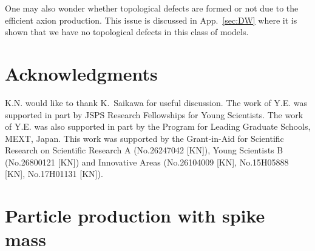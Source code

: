 \documentclass[12pt, a4paper]{article}
\begin{document}
One may also wonder whether topological defects are formed or not due to the efficient axion production.
This issue is discussed in App.~\ref{sec:DW} where it is shown that we have no topological defects in this class of models.




\section*{Acknowledgments}

K.N. would like to thank K.~Saikawa for useful discussion.
The work of Y.E. was supported in part by JSPS Research Fellowships for Young Scientists.
The work of Y.E. was also supported in part by the Program for Leading Graduate Schools, MEXT, Japan.
This work was supported by the Grant-in-Aid for Scientific Research on Scientific Research A (No.26247042 [KN]),
Young Scientists B (No.26800121 [KN]) and Innovative Areas (No.26104009 [KN], No.15H05888 [KN], No.17H01131 [KN]).


\appendix
\section{Particle production with spike mass}  \label{sec:spike}
\end{document}
